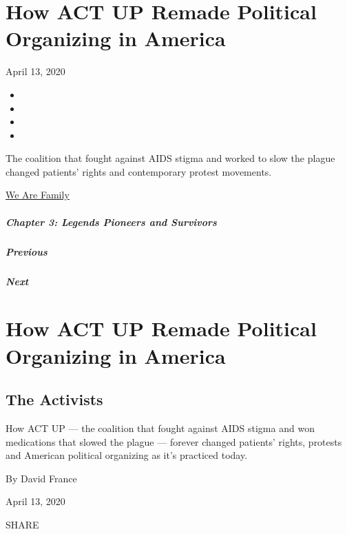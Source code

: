 \hypertarget{how-act-up-remade-political-organizing-in-america}{%
\section{How ACT UP Remade Political Organizing in
America}\label{how-act-up-remade-political-organizing-in-america}}

April 13, 2020

\begin{itemize}
\item
\item
\item
\item
\end{itemize}

The coalition that fought against AIDS stigma and worked to slow the
plague changed patients' rights and contemporary protest movements.

\href{https://www.nytimes.com/interactive/2020/04/13/t-magazine/culture-issue-2020.html}{We
Are Family}

\hypertarget{chapter-3-legends-pioneers-and-survivors}{%
\subparagraph{Chapter 3: Legends Pioneers and
Survivors}\label{chapter-3-legends-pioneers-and-survivors}}

\hypertarget{previous}{%
\subparagraph{Previous}\label{previous}}

\hypertarget{next}{%
\subparagraph{Next}\label{next}}

\hypertarget{how-act-up-remade-political-organizing-in-america-1}{%
\section{How ACT UP Remade Political Organizing in
America}\label{how-act-up-remade-political-organizing-in-america-1}}

\hypertarget{the-activists}{%
\subsection{The Activists}\label{the-activists}}

How ACT UP --- the coalition that fought against AIDS stigma and won
medications that slowed the plague --- forever changed patients' rights,
protests and American political organizing as it's practiced today.

By David France

April 13, 2020

SHARE

